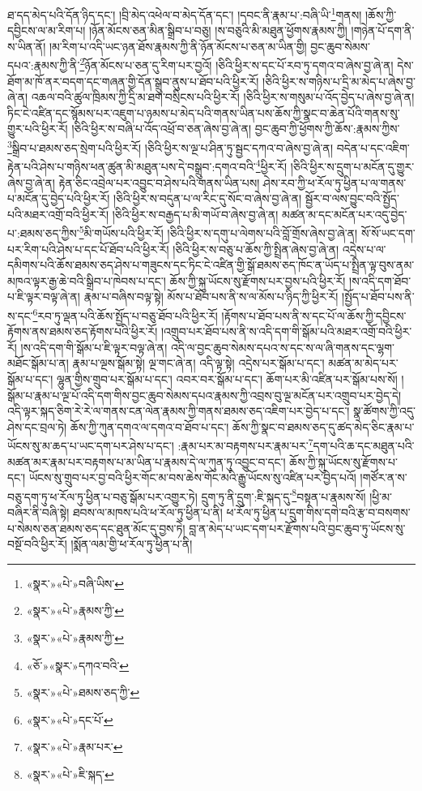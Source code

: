 ཐ་དད་མེད་པའི་དོན་ཉིད་དང་། །བྲི་མེད་འཕེལ་བ་མེད་དོན་དང་། །དབང་ནི་རྣམ་པ་:བཞི་ཡི་\footnote{«སྣར་»«པེ་»བཞི་ཡིས་}གནས། །ཆོས་ཀྱི་དབྱིངས་ལ་མ་རིག་པ། །ཉོན་མོངས་ཅན་མིན་སྒྲིབ་པ་བཅུ། །ས་བཅུའི་མི་མཐུན་ཕྱོགས་རྣམས་ཀྱི། །གཉེན་པོ་དག་ནི་ས་ཡིན་ནོ། །མ་རིག་པ་འདི་ཡང་ཉན་ཐོས་རྣམས་ཀྱི་ནི་ཉོན་མོངས་པ་ཅན་མ་ཡིན་གྱི། བྱང་ཆུབ་སེམས་དཔའ་:རྣམས་ཀྱི་ནི་\footnote{«སྣར་»«པེ་»རྣམས་ཀྱི་}ཉོན་མོངས་པ་ཅན་དུ་རིག་པར་བྱའོ། །ཅིའི་ཕྱིར་ས་དང་པོ་རབ་ཏུ་དགའ་བ་ཞེས་བྱ་ཞེ་ན། དེས་ཐོག་མ་ཁོ་ནར་བདག་དང་གཞན་གྱི་དོན་སྒྲུབ་ནུས་པ་ཐོབ་པའི་ཕྱིར་རོ། །ཅིའི་ཕྱིར་ས་གཉིས་པ་དྲི་མ་མེད་པ་ཞེས་བྱ་ཞེ་ན། འཆལ་བའི་ཚུལ་ཁྲིམས་ཀྱི་དྲི་མ་ཐག་བསྲིངས་པའི་ཕྱིར་རོ། །ཅིའི་ཕྱིར་ས་གསུམ་པ་འོད་བྱེད་པ་ཞེས་བྱ་ཞེ་ན། ཏིང་ངེ་འཛིན་དང་སྙོམས་པར་འཇུག་པ་ཉམས་པ་མེད་པའི་གནས་ཡིན་པས་ཆོས་ཀྱི་སྣང་བ་ཆེན་པོའི་གནས་སུ་གྱུར་པའི་ཕྱིར་རོ། །ཅིའི་ཕྱིར་ས་བཞི་པ་འོད་འཕྲོ་བ་ཅན་ཞེས་བྱ་ཞེ་ན། བྱང་ཆུབ་ཀྱི་ཕྱོགས་ཀྱི་ཆོས་:རྣམས་ཀྱིས་\footnote{«སྣར་»«པེ་»རྣམས་ཀྱི་}སྒྲིབ་པ་ཐམས་ཅད་སྲེག་པའི་ཕྱིར་རོ། །ཅིའི་ཕྱིར་ས་ལྔ་པ་ཤིན་ཏུ་སྦྱང་དཀའ་བ་ཞེས་བྱ་ཞེ་ན། བདེན་པ་དང་འཇིག་རྟེན་པའི་ཤེས་པ་གཉིས་ཕན་ཚུན་མི་མཐུན་པས་དེ་བསྒྲུབ་:དགའ་བའི་\footnote{«ཅོ་»«སྣར་»དཀའ་བའི་}ཕྱིར་རོ། །ཅིའི་ཕྱིར་ས་དྲུག་པ་མངོན་དུ་གྱུར་ཞེས་བྱ་ཞེ་ན། རྟེན་ཅིང་འབྲེལ་པར་འབྱུང་བ་ཤེས་པའི་གནས་ཡིན་པས། ཤེས་རབ་ཀྱི་ཕ་རོལ་ཏུ་ཕྱིན་པ་ལ་གནས་པ་མངོན་དུ་བྱེད་པའི་ཕྱིར་རོ། །ཅིའི་ཕྱིར་ས་བདུན་པ་ལ་རིང་དུ་སོང་བ་ཞེས་བྱ་ཞེ་ན། སྦྱོར་བ་ལས་བྱུང་བའི་སྤྱོད་པའི་མཐར་འགྲོ་བའི་ཕྱིར་རོ། །ཅིའི་ཕྱིར་ས་བརྒྱད་པ་མི་གཡོ་བ་ཞེས་བྱ་ཞེ་ན། མཚན་མ་དང་མངོན་པར་འདུ་བྱེད་པ་:ཐམས་ཅད་ཀྱིས་\footnote{«སྣར་»«པེ་»ཐམས་ཅད་ཀྱི་}མི་གཡོས་པའི་ཕྱིར་རོ། །ཅིའི་ཕྱིར་ས་དགུ་པ་ལེགས་པའི་བློ་གྲོས་ཞེས་བྱ་ཞེ་ན། སོ་སོ་ཡང་དག་པར་རིག་པའི་ཤེས་པ་དང་པོ་ཐོབ་པའི་ཕྱིར་རོ། །ཅིའི་ཕྱིར་ས་བཅུ་པ་ཆོས་ཀྱི་སྤྲིན་ཞེས་བྱ་ཞེ་ན། འདྲེས་པ་ལ་དམིགས་པའི་ཆོས་ཐམས་ཅད་ཤེས་པ་གཟུངས་དང་ཏིང་ངེ་འཛིན་གྱི་སྒོ་ཐམས་ཅད་ཁོང་ན་ཡོད་པ་སྤྲིན་ལྟ་བུས་ནམ་མཁའ་ལྟར་རྒྱ་ཆེ་བའི་སྒྲིབ་པ་ཁེབས་པ་དང་། ཆོས་ཀྱི་སྐུ་ཡོངས་སུ་རྫོགས་པར་བྱས་པའི་ཕྱིར་རོ། །ས་འདི་དག་ཐོབ་པ་ཇི་ལྟར་བལྟ་ཞེ་ན། རྣམ་པ་བཞིས་བལྟ་སྟེ། མོས་པ་ཐོབ་པས་ནི་ས་ལ་མོས་པ་ཉིད་ཀྱི་ཕྱིར་རོ། །སྤྱོད་པ་ཐོབ་པས་ནི་ས་དང་\footnote{«སྣར་»«པེ་»དང་པོ་}རབ་ཏུ་ལྡན་པའི་ཆོས་སྤྱོད་པ་བཅུ་ཐོབ་པའི་ཕྱིར་རོ། །རྟོགས་པ་ཐོབ་པས་ནི་ས་དང་པོ་ལ་ཆོས་ཀྱི་དབྱིངས་རྟོགས་ནས་ཐམས་ཅད་རྟོགས་པའི་ཕྱིར་རོ། །འགྲུབ་པར་ཐོབ་པས་ནི་ས་འདི་དག་གི་སྒོམ་པའི་མཐར་འགྲོ་བའི་ཕྱིར་རོ། །ས་འདི་དག་གི་སྒོམ་པ་ཇི་ལྟར་བལྟ་ཞེ་ན། འདི་ལ་བྱང་ཆུབ་སེམས་དཔའ་ས་དང་ས་ལ་ཞི་གནས་དང་ལྷག་མཐོང་སྒོམ་པ་ན། རྣམ་པ་ལྔས་སྒོམ་སྟེ། ལྔ་གང་ཞེ་ན། འདི་ལྟ་སྟེ། འདྲེས་པར་སྒོམ་པ་དང་། མཚན་མ་མེད་པར་སྒོམ་པ་དང་། ལྷུན་གྱིས་གྲུབ་པར་སྒོམ་པ་དང་། འབར་བར་སྒོམ་པ་དང་། ཆོག་པར་མི་འཛིན་པར་སྒོམ་པས་སོ། །སྒོམ་པ་རྣམ་པ་ལྔ་པོ་འདི་དག་གིས་བྱང་ཆུབ་སེམས་དཔའ་རྣམས་ཀྱི་འབྲས་བུ་ལྔ་མངོན་པར་འགྲུབ་པར་བྱེད་དེ། འདི་ལྟར་སྐད་ཅིག་རེ་རེ་ལ་གནས་ངན་ལེན་རྣམས་ཀྱི་གནས་ཐམས་ཅད་འཇིག་པར་བྱེད་པ་དང་། སྣ་ཚོགས་ཀྱི་འདུ་ཤེས་དང་བྲལ་ཏེ། ཆོས་ཀྱི་ཀུན་དགའ་ལ་དགའ་བ་ཐོབ་པ་དང་། ཆོས་ཀྱི་སྣང་བ་ཐམས་ཅད་དུ་ཚད་མེད་ཅིང་རྣམ་པ་ཡོངས་སུ་མ་ཆད་པ་ཡང་དག་པར་ཤེས་པ་དང་། :རྣམ་པར་མ་བརྟགས་པར་རྣམ་པར་\footnote{«སྣར་»«པེ་»རྣམ་པར་}དག་པའི་ཆ་དང་མཐུན་པའི་མཚན་མར་རྣམ་པར་བརྟགས་པ་མ་ཡིན་པ་རྣམས་དེ་ལ་ཀུན་ཏུ་འབྱུང་བ་དང་། ཆོས་ཀྱི་སྐུ་ཡོངས་སུ་རྫོགས་པ་དང་། ཡོངས་སུ་གྲུབ་པར་བྱ་བའི་ཕྱིར་གོང་མ་བས་ཆེས་གོང་མའི་རྒྱུ་ཡོངས་སུ་འཛིན་པར་བྱེད་པའོ། །གཙོར་ན་ས་བཅུ་དག་ཏུ་ཕ་རོལ་ཏུ་ཕྱིན་པ་བཅུ་སྒོམ་པར་འགྱུར་ཏེ། དྲུག་ཏུ་ནི་དྲུག་:ཇི་སྐད་དུ་\footnote{«སྣར་»«པེ་»ཇི་སྐད་}བསྟན་པ་རྣམས་སོ། །ཕྱི་མ་བཞིར་ནི་བཞི་སྟེ། ཐབས་ལ་མཁས་པའི་ཕ་རོལ་ཏུ་ཕྱིན་པ་ནི། ཕ་རོལ་ཏུ་ཕྱིན་པ་དྲུག་གིས་དགེ་བའི་རྩ་བ་བསགས་པ་སེམས་ཅན་ཐམས་ཅད་དང་ཐུན་མོང་དུ་བྱས་ཏེ། བླ་ན་མེད་པ་ཡང་དག་པར་རྫོགས་པའི་བྱང་ཆུབ་ཏུ་ཡོངས་སུ་བསྔོ་བའི་ཕྱིར་རོ། །སྨོན་ལམ་གྱི་ཕ་རོལ་ཏུ་ཕྱིན་པ་ནི། 